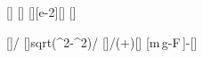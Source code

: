 [\kg]
[\meter]
[\cm][e-2][\meter]
[\mpss]

[]{\hSX/\lSX}
[]{sqrt(\lSX^2-\hSX^2)/\lSX}
[]{\muGX*\mX*\gX/(\caX+\muGX*\saX)}[\newton]
[m\,g-F\,\sin\alpha]{\mX*\gX-\FZX*\saX}[\newton]
